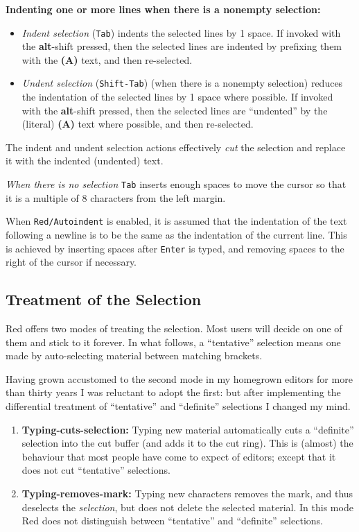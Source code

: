 \documentclass[
]{article}
\begin{document}
\textbf{Indenting one or more lines when there is a nonempty selection:}

\begin{itemize}
\item
  \emph{Indent selection} (\texttt{Tab}) indents the selected lines by 1
  space. If invoked with the \textbf{alt}-shift pressed, then the
  selected lines are indented by prefixing them with the \textbf{(A)}
  text, and then re-selected.
\item
  \emph{Undent selection} (\texttt{Shift-Tab}) (when there is a nonempty
  selection) reduces the indentation of the selected lines by 1 space
  where possible. If invoked with the \textbf{alt}-shift pressed, then
  the selected lines are ``undented'' by the (literal) \textbf{(A)} text
  where possible, and then re-selected.
\end{itemize}

The indent and undent selection actions effectively \emph{cut} the
selection and replace it with the indented (undented) text.

\emph{When there is no selection} \texttt{Tab} inserts enough spaces to
move the cursor so that it is a multiple of 8 characters from the left
margin.

When \texttt{Red/Autoindent} is enabled, it is assumed that the
indentation of the text following a newline is to be the same as the
indentation of the current line. This is achieved by inserting spaces
after \texttt{Enter} is typed, and removing spaces to the right of the
cursor if necessary.

\hypertarget{treatment-of-the-selection}{%
\subsection{Treatment of the
Selection}\label{treatment-of-the-selection}}

Red offers two modes of treating the selection. Most users will decide
on one of them and stick to it forever. In what follows, a ``tentative''
selection means one made by auto-selecting material between matching
brackets.

Having grown accustomed to the second mode in my homegrown editors for
more than thirty years I was reluctant to adopt the first: but after
implementing the differential treatment of ``tentative'' and
``definite'' selections I changed my mind.

\begin{enumerate}
\def\labelenumi{\arabic{enumi}.}
\item
  \textbf{Typing-cuts-selection:} Typing new material automatically cuts
  a ``definite'' selection into the cut buffer (and adds it to the cut
  ring). This is (almost) the behaviour that most people have come to
  expect of editors; except that it does not cut ``tentative''
  selections.
\item
  \textbf{Typing-removes-mark:} Typing new characters removes the mark,
  and thus deselects the \emph{selection}, but does not delete the
  selected material. In this mode Red does not distinguish between
  ``tentative'' and ``definite'' selections.
\end{enumerate}
\end{document}
